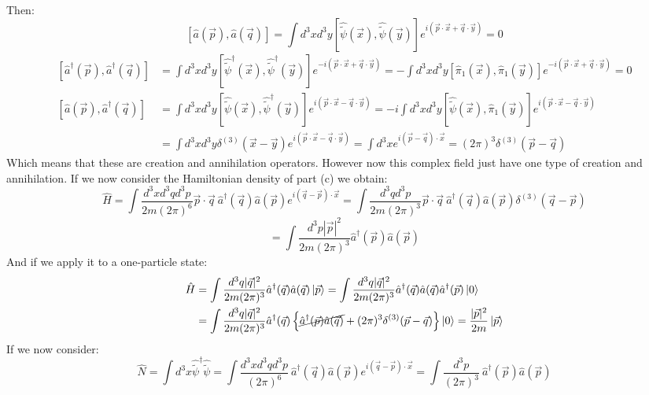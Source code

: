 \documentclass[12pt]{article}
\begin{document}
Then:
\[
    \left[\hat{a}(\vec{p}),\hat{a}(\vec{q})\right] = \int d^3xd^3y\left[\hat{\tilde{\psi}}(\vec{x}),\hat{\tilde{\psi}}(\vec{y})\right]e^{i(\vec{p}\cdot\vec{x}+\vec{q}\cdot\vec{y})}=0
\]
\[
    \begin{aligned}
        \left[\hat{a}^\dagger(\vec{p}),\hat{a}^\dagger(\vec{q})\right] &= \int d^3xd^3y\left[\hat{\tilde{\psi}}^\dagger(\vec{x}),\hat{\tilde{\psi}}^\dagger(\vec{y})\right]e^{-i(\vec{p}\cdot\vec{x}+\vec{q}\cdot\vec{y})} = -\int d^3xd^3y\left[\hat{\pi}_1(\vec{x}),\hat{\pi}_1(\vec{y})\right]e^{-i(\vec{p}\cdot\vec{x}+\vec{q}\cdot\vec{y})}=0 \\
        \left[\hat{a}(\vec{p}),\hat{a}^\dagger(\vec{q})\right] &= \int d^3xd^3y\left[\hat{\tilde{\psi}}(\vec{x}),\hat{\tilde{\psi}}^\dagger(\vec{y})\right]e^{i(\vec{p}\cdot\vec{x}-\vec{q}\cdot\vec{y})} = -i\int d^3xd^3y\left[\hat{\tilde{\psi}}(\vec{x}),\hat{\pi}_1(\vec{y})\right]e^{i(\vec{p}\cdot\vec{x}-\vec{q}\cdot\vec{y})}\\
        &= \int d^3xd^3y\delta^{(3)}(\vec{x}-\vec{y})e^{i (\vec{p}\cdot \vec{x} - \vec{q}\cdot\vec{y})}= \int d^3xe^{i (\vec{p} - \vec{q})\cdot\vec{x}}=(2\pi)^3\delta^{(3)}(\vec{p}-\vec{q})
    \end{aligned}
\]
Which means that these are creation and annihilation operators. However now this complex field just have one type of creation and annihilation. If we now consider the Hamiltonian density of part (c) we obtain:
\[
    \hat{H}=\int \frac{d^3xd^3qd^3p}{2m(2\pi)^6}\vec{p}\cdot\vec{q} ~ \hat{a}^\dagger(\vec{q})\hat{a}(\vec{p})e^{i(\vec{q}-\vec{p})\cdot\vec{x}}=\int \frac{d^3qd^3p}{2m(2\pi)^3}\vec{p}\cdot\vec{q} ~ \hat{a}^\dagger(\vec{q})\hat{a}(\vec{p})\delta^{(3)}(\vec{q}-\vec{p})
\]
\[
    =\int \frac{d^3p|\vec{p}|^2}{2m(2\pi)^3} \hat{a}^\dagger(\vec{p})\hat{a}(\vec{p})
\]
And if we apply it to a one-particle state:
\[
    \begin{aligned}
        \hat{H} &= \int \frac{d^3q|\vec{q}|^2}{2m(2\pi)^3} \hat{a}^\dagger(\vec{q})\hat{a}(\vec{q}) \ket{\vec{p}} = \int \frac{d^3q|\vec{q}|^2}{2m(2\pi)^3} \hat{a}^\dagger(\vec{q})\hat{a}(\vec{q})\hat{a}^\dagger(\vec{p})\ket{0} \\
                &= \int \frac{d^3q|\vec{q}|^2}{2m(2\pi)^3} \hat{a}^\dagger(\vec{q})\left\{\cancel{\hat{a}^\dagger(\vec{p})\hat{a}(\vec{q})}+(2\pi)^3 \delta^{(3)}(\vec{p}-\vec{q}) \right\}\ket{0} = \frac{|\vec{p}|^2}{2m}\ket{\vec{p}}
    \end{aligned}
\]
If we now consider:
\[
    \hat{N}=\int d^3x \hat{\tilde{\psi}}^\dagger\hat{\tilde{\psi}}=\int \frac{d^3xd^3qd^3p}{(2\pi)^6} ~ \hat{a}^\dagger(\vec{q})\hat{a}(\vec{p})e^{i(\vec{q}-\vec{p})\cdot\vec{x}}=\int \frac{d^3p}{(2\pi)^3} ~ \hat{a}^\dagger(\vec{p})\hat{a}(\vec{p})
\]
\end{document}
